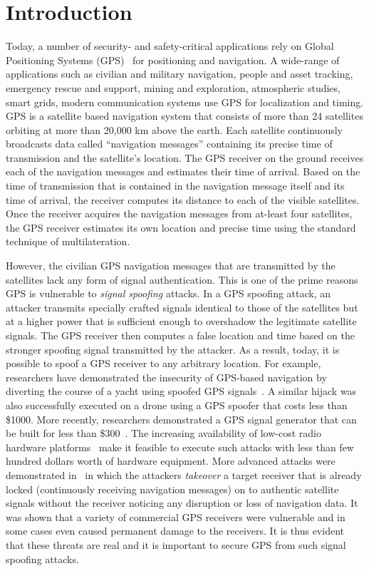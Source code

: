 \documentclass[letterpaper,twocolumn,10pt]{article}
\begin{document}
  
\section{Introduction}
Today, a number of security- and safety-critical applications rely on Global Positioning Systems (GPS)~\cite{misra2006global} for positioning and navigation. A wide-range of applications such as civilian and military navigation, people and asset tracking, emergency rescue and support, mining and exploration, atmospheric studies, smart grids, modern communication systems use GPS for localization and timing. GPS is a satellite based navigation system that consists of more than 24 satellites orbiting at more than 20,000 km above the earth. Each satellite continuously broadcasts data called ``navigation messages'' containing its precise time of transmission and the satellite’s location. The GPS receiver on the ground receives each of the navigation messages and estimates their time of arrival.  Based on the time of transmission that is contained in the navigation message itself and its time of arrival, the receiver computes its distance to each of the visible satellites. Once the receiver acquires the navigation messages from at-least four satellites, the GPS receiver estimates its own location and precise time using the standard technique of multilateration.

However, the civilian GPS navigation messages that are transmitted by the satellites lack any form of signal authentication. This is one of the prime
reasons GPS is vulnerable to \emph{signal spoofing} attacks. In a GPS
spoofing attack, an attacker transmits specially crafted signals identical to
those of the satellites but at a higher power that is sufficient enough to overshadow the legitimate satellite signals. The GPS receiver then computes a false location and time based on the stronger spoofing signal transmitted by the attacker. As a result, today, it is possible to spoof a GPS receiver to any arbitrary location. For example, researchers have demonstrated the insecurity of GPS-based navigation by diverting the course of a yacht using spoofed GPS signals~\cite{yacht_spoofing}. A similar hijack was also successfully executed on a drone using a GPS spoofer that costs less than \$1000. More recently, researchers demonstrated a GPS signal generator that can be built for less than \$300~\cite{lowcost_gps}. The increasing availability of low-cost radio hardware platforms~\cite{ettus_research} make it feasible to execute such attacks with less than few hundred dollars worth of hardware equipment. More advanced attacks were demonstrated in~\cite{NighswanderCCS2012,Tippenhauer2011} in which the attackers \textit{takeover} a target receiver that is already locked (continuously receiving navigation messages) on to authentic satellite signals without the receiver noticing any disruption or loss of navigation data. It was shown that a variety of commercial GPS receivers were vulnerable and in some cases even caused permanent damage to the receivers. It is thus evident that these threats are real and it is important to secure GPS from such signal spoofing attacks.
\end{document}
